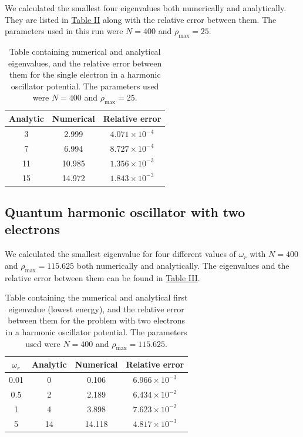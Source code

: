 \documentclass[reprint,english,notitlepage]{revtex4-1}  %
\begin{document}
We calculated the smallest four eigenvalues both numerically and analytically. They are listed in \hyperref[table:IV:b:1]{Table II} along with the relative error between them. The parameters used in this run were $N=400$ and $\rho_\text{max} = 25$.

\begin{table}[h!] \label{table:IV:b:1}
\caption{Table containing numerical and analytical eigenvalues, and the relative error between them for the single electron in a harmonic oscillator potential. The parameters used were $N=400$ and $\rho_\text{max} = 25$.}
\begin{tabular}{|c|c|c|}
\hline 
Analytic & Numerical & Relative error \\
\hline
    3     &      2.999   &    $4.071 \times 10^{-4}$ \\
\hline
    7     &      6.994   &    $8.727 \times 10^{-4}$ \\
\hline
   11     &     10.985   &    $1.356 \times 10^{-3}$ \\
\hline
   15     &     14.972   &    $1.843 \times 10^{-3}$ \\
\hline
\end{tabular}
\end{table}


\subsection{Quantum harmonic oscillator with two electrons}\label{sec:IV:c}

We calculated the smallest eigenvalue for four different values of $\omega_r$ with $N=400$ and $\rho_\text{max} = 115.625$ both numerically and analytically. The eigenvalues and the relative error between them can be found in \hyperref[table:IV:c:1]{Table III}. 

\begin{table}[h!] \label{table:IV:c:1}
\caption{Table containing the numerical and analytical first eigenvalue (lowest energy), and the relative error between them for the problem with two electrons in a harmonic oscillator potential. The parameters used were $N=400$ and $\rho_\text{max} = 115.625$.}
\begin{tabular}{|c|c|c|c|}
\hline 
$\omega_r$ & Analytic & Numerical & Relative error \\
\hline
0.01 &    0     &      0.106  &    $6.966 \times 10^{-3}$ \\
\hline
0.5 &    2     &      2.189   &    $6.434 \times 10^{-2}$ \\
\hline
1 &   4     &     3.898   &    $7.623 \times 10^{-2}$ \\
\hline
5 &   14     &     14.118   &    $4.817 \times 10^{-3}$ \\
\hline
\end{tabular}
\end{table}
\end{document}
